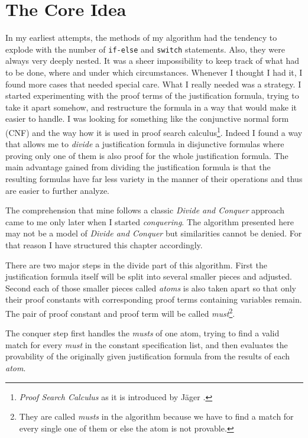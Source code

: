 \section{The Core Idea}
In my earliest attempts, the methods of my algorithm had the tendency to explode with the number of \texttt{if-else} and \texttt{switch} statements. Also, they were always very deeply nested. It was a sheer impossibility to keep track of what had to be done, where and under which circumstances. Whenever I thought I had it, I found more cases that needed special care. What I really needed was a strategy. I started experimenting with the proof terms of the justification formula, trying to take it apart somehow, and restructure the formula in a way that would make it easier to handle. I was looking for something like the conjunctive normal form (CNF) and the way how it is used in proof search calculus\footnote{\emph{Proof Search Calculus} as it is introduced by Jäger \cite{jaeg}.}. Indeed I found a way that allows me to \emph{divide} a justification formula in disjunctive formulas where proving only one of them is also proof for the whole justification formula. The main advantage gained from dividing the justification formula is that the resulting formulas have far less variety in the manner of their operations and thus are easier to further analyze.

The comprehension that mine follows a classic \emph{Divide and Conquer} approach came to me only later when I started \emph{conquering}. The algorithm presented here may not be a model of \emph{Divide and Conquer} but similarities cannot be denied. For that reason I have structured this chapter accordingly.

\medskip

There are two major steps in the divide part of this algorithm. First the justification formula itself will be split into several smaller pieces and adjusted. Second each of those smaller pieces called \emph{atoms} is also taken apart so that only their proof constants with corresponding proof terms containing variables remain. The pair of proof constant and proof term will be called \emph{must}\footnote{They are called \emph{musts} in the algorithm because we have to find a match for every single one of them or else the atom is not provable.}.

The conquer step first handles the \emph{musts} of one atom, trying to find a valid match for every \emph{must} in the constant specification list, and then evaluates the provability of the originally given justification formula from the results of each \emph{atom}.

